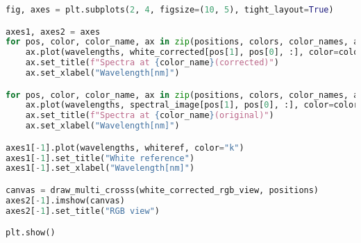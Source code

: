 \begin{lstlisting}[language=python, caption=White correction for SpecimIQ with large reference, label={code:wc-specimiq-large}]
fig, axes = plt.subplots(2, 4, figsize=(10, 5), tight_layout=True)

axes1, axes2 = axes
for pos, color, color_name, ax in zip(positions, colors, color_names, axes2):
    ax.plot(wavelengths, white_corrected[pos[1], pos[0], :], color=color)
    ax.set_title(f"Spectra at {color_name}(corrected)")
    ax.set_xlabel("Wavelength[nm]")

for pos, color, color_name, ax in zip(positions, colors, color_names, axes1):
    ax.plot(wavelengths, spectral_image[pos[1], pos[0], :], color=color)
    ax.set_title(f"Spectra at {color_name}(original)")
    ax.set_xlabel("Wavelength[nm]")

axes1[-1].plot(wavelengths, whiteref, color="k")
axes1[-1].set_title("White reference")
axes1[-1].set_xlabel("Wavelength[nm]")

canvas = draw_multi_crosss(white_corrected_rgb_view, positions)
axes2[-1].imshow(canvas)
axes2[-1].set_title("RGB view")

plt.show()

\end{lstlisting}
